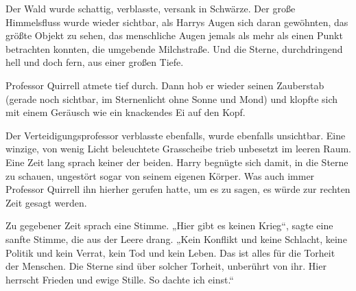 
Der Wald wurde schattig, verblasste, versank in Schwärze. Der große Himmelsfluss wurde wieder sichtbar, als Harrys Augen sich daran gewöhnten, das größte Objekt zu sehen, das menschliche Augen jemals als mehr als einen Punkt betrachten konnten, die umgebende Milchstraße. Und die Sterne, durchdringend hell und doch fern, aus einer großen Tiefe.

Professor Quirrell atmete tief durch. Dann hob er wieder seinen Zauberstab (gerade noch sichtbar, im Sternenlicht ohne Sonne und Mond) und klopfte sich mit einem Geräusch wie ein knackendes Ei auf den Kopf.



Der Verteidigungsprofessor verblasste ebenfalls, wurde ebenfalls unsichtbar. Eine winzige, von wenig Licht beleuchtete Grasscheibe trieb unbesetzt im leeren Raum. Eine Zeit lang sprach keiner der beiden. Harry begnügte sich damit, in die Sterne zu schauen, ungestört sogar von seinem eigenen Körper. Was auch immer Professor Quirrell ihn hierher gerufen hatte, um es zu sagen, es würde zur rechten Zeit gesagt werden.


Zu gegebener Zeit sprach eine Stimme. „Hier gibt es keinen Krieg“, sagte eine sanfte Stimme, die aus der Leere drang. „Kein Konflikt und keine Schlacht, keine Politik und kein Verrat, kein Tod und kein Leben. Das ist alles für die Torheit der Menschen. Die Sterne sind über solcher Torheit, unberührt von ihr. Hier herrscht Frieden und ewige Stille. So dachte ich einst.“


